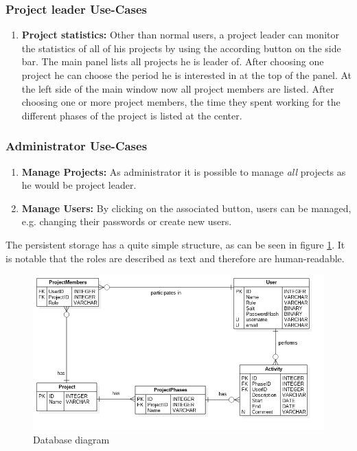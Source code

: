\subsubsection{Project leader Use-Cases}
\begin{enumerate}
\item \textbf{Project statistics:} Other than normal users, a project leader can monitor the statistics of all of his projects by using the according button on the side bar. The main panel lists all projects he is leader of. After choosing one project he can choose the period he is interested in at the top of the panel. At the left side of the main window now all project members are listed. After choosing one or more project members, the time they spent working for the different phases of the project is listed at the center.
\end{enumerate}


\subsubsection{Administrator Use-Cases}
\begin{enumerate}
\item \textbf{Manage Projects:} As administrator it is possible to manage \emph{all} projects as he would be project leader.
\item \textbf{Manage Users:} By clicking on the associated button, users can be managed, e.g. changing their passwords or create new users.
\end{enumerate}


The persistent storage has a quite simple structure, as can be seen in figure \ref{fig:database}. It is notable that the roles are described as text and therefore are human-readable. 
\begin{figure}[htbp]
\includegraphics[width=\textwidth]{./content/pictures/database.png}
\caption{Database diagram}
\label{fig:database}
\end{figure}

